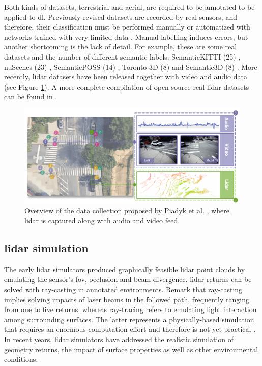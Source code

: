 Both kinds of datasets, terrestrial and aerial, are required to be annotated to be applied to \acrshort{dl}. Previously revised datasets are recorded by real sensors, and therefore, their classification must be performed manually \cite{behley_towards_2021, pan_semanticposs_2020, tan_toronto-3d_2020} or automatized with networks trained with very limited data \cite{wu_squeezesegv2_2019}. Manual labelling induces errors, but another shortcoming is the lack of detail. For example, these are some real datasets and the number of different semantic labels: SemanticKITTI (25) \cite{behley_towards_2021}, nuScenes (23) \cite{caesar_nuscenes_2020}, SemanticPOSS (14) \cite{pan_semanticposs_2020}, Toronto-3D (8) \cite{tan_toronto-3d_2020} and Semantic3D (8) \cite{hackel_semantic3d_2017}. More recently, \acrshort{lidar} datasets have been released together with video and audio data \cite{piadyk_streetaware_2023} (see Figure \ref{fig:lidar_audio_video}). A more complete compilation of open-source real \acrshort{lidar} datasets can be found in \cite{cai_survey_2022}. 

\begin{figure}[ht]
	\includegraphics[width=\linewidth]{figs/context/lidar_dataset_audio_video.png}
	\caption{Overview of the data collection proposed by Piadyk et al. \cite{piadyk_streetaware_2023}, where \acrshort{lidar} is captured along with audio and video feed. }
    \label{fig:lidar_audio_video}
\end{figure}

\subsection{\acrshort{lidar} simulation}

The early \acrshort{lidar} simulators produced graphically feasible \acrshort{lidar} point clouds \cite{gschwandtner_blensor_2011} by emulating the sensor's \acrshort{fov}, occlusion and beam divergence. \acrshort{lidar} returns can be solved with ray-casting \cite{ahn_real-time_2020, zhao_method_2021, bechtold_helios_2016} in annotated environments. Remark that ray-casting implies solving impacts of laser beams in the followed path, frequently ranging from one to five returns, whereas ray-tracing refers to emulating light interaction among surrounding surfaces. The latter represents a physically-based simulation that requires an enormous computation effort and therefore is not yet practical \cite{ahn_real-time_2020}. In recent years, \acrshort{lidar} simulators have addressed the realistic simulation of geometry returns, the impact of surface properties as well as other environmental conditions. 

